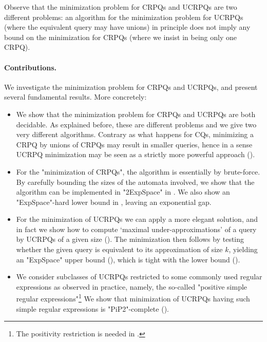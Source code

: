 Observe that the minimization problem for CRPQs and UCRPQs are two different problems: an algorithm for the minimization problem for UCRPQs (where the equivalent query may have unions) in principle does not imply any bound on the minimization for CRPQs (where we insist in being only one CRPQ). 

\paragraph{Contributions.}
We investigate the minimization problem for CRPQs and UCRPQs, and present several fundamental results. More concretely:
\begin{itemize}
	\item We show that the minimization problem for CRPQs and UCRPQs are both decidable. As explained before, these are different problems  and we give two very different algorithms. Contrary as what happens for CQs, minimizing a CRPQ by unions of CRPQs may result in smaller queries, hence in a sense UCRPQ minimization may be seen as a strictly more powerful approach ().
	\item For the "minimization of CRPQs", the algorithm is essentially by brute-force. By carefully bounding the sizes of the automata involved, we show that the algorithm can be implemented in "2ExpSpace" in . We also show an "ExpSpace"-hard lower bound in , leaving an exponential gap.
	\item For the minimization of UCRPQs we can apply a more elegant solution, and in fact we show how to compute `maximal under-approximations' of a query by UCRPQs of a given size (). The minimization then follows by testing whether the given query is equivalent to its approximation of size $k$, yielding an "ExpSpace" upper bound (), which is tight with the lower bound ().
	\item We consider subclasses of UCRPQs restricted to some commonly used regular expressions as observed in practice, namely, the so-called "positive simple regular expressions"\footnote{The positivity restriction is needed in .}
		We show that minimization of UCRPQs having such simple regular expressions is
		"PiP2"-complete (). %

\end{itemize}
